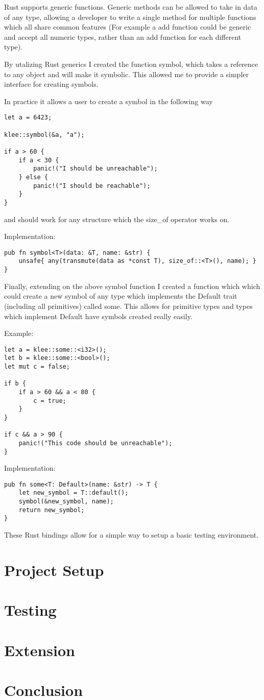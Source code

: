 \documentclass{report}
\begin{document}
Rust supports generic functions. Generic methods can be allowed to take in data of any type, allowing a developer to write a single method for multiple functions which all share common features (For example a add function could be generic and accept all numeric types, rather than an add function for each different type).

By utalizing Rust generics I created the function symbol, which takes a reference to any object and will make it symbolic. This allowed me to provide a simpler interface for creating symbols.

In practice it allows a user to create a symbol in the following way

\begin {lstlisting}
let a = 6423;

klee::symbol(&a, "a");

if a > 60 {
	if a < 30 {
		panic!("I should be unreachable");
	} else {
		panic!("I should be reachable");
	}
}
\end {lstlisting}

and should work for any structure which the size_of operator works on.

Implementation:
\begin {lstlisting}
pub fn symbol<T>(data: &T, name: &str) {
    unsafe{ any(transmute(data as *const T), size_of::<T>(), name); }
}
\end {lstlisting}

Finally, extending on the above symbol function I created a function which which could create a new symbol of any type which implements the Default trait (including all primitives) called some. This allows for primitive types and types which implement Default have symbols created really easily.

Example:
\begin{lstlisting}
let a = klee::some::<i32>();
let b = klee::some::<bool>();
let mut c = false;

if b {
	if a > 60 && a < 80 {
		c = true;
	}
}

if c && a > 90 {
	panic!("This code should be unreachable");
}
\end{lstlisting}

Implementation:
\begin{lstlisting}
pub fn some<T: Default>(name: &str) -> T {
    let new_symbol = T::default();
    symbol(&new_symbol, name);
    return new_symbol;
}
\end{lstlisting}

These Rust bindings allow for a simple way to setup a basic testing environment.
\chapter {Project Setup}



\chapter {Testing}
\chapter {Extension}
\chapter {Conclusion}
\end{document}
